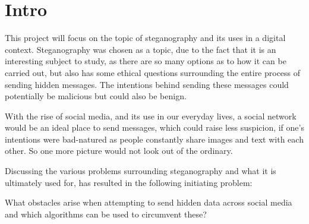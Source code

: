 \section{Intro}
This project will focus on the topic of steganography and its uses in a digital context. 
Steganography was chosen as a topic, due to the fact that it is an interesting subject to study, as there are so many options as to how it can be carried out, but also has some ethical questions surrounding the entire process of sending hidden messages. 
The intentions behind sending these messages could potentially be malicious but could also be benign.

With the rise of social media, and its use in our everyday lives, a social network would be an ideal place to send messages, which could raise less suspicion, if one's intentions were bad-natured as people constantly share images and text with each other.
So one more picture would not look out of the ordinary.

Discussing the various problems surrounding steganography and what it is ultimately used for, has resulted in the following initiating problem:
\begin{tcolorbox}
What obstacles arise when attempting to send hidden data across social media and which algorithms can be used to circumvent these?
\end{tcolorbox}
